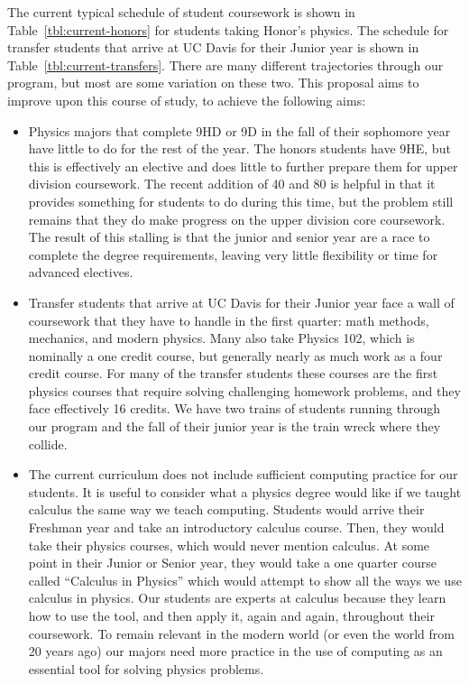\documentclass[12pt]{article}
\begin{document}
The current typical schedule of student coursework is shown in Table~\ref{tbl:current-honors} for students taking Honor's physics.  The schedule for transfer students that arrive at UC Davis for their Junior year is shown in Table~\ref{tbl:current-transfers}.  There are many different trajectories through our program, but most are some variation on these two.  This proposal aims to improve upon this course of study, to achieve the following aims:
\begin{itemize}

\item Physics majors that complete 9HD or 9D in the fall of their sophomore year have little to do for the rest of the year.  The honors students have 9HE, but this is effectively an elective and does little to further prepare them for upper division coursework.  The recent addition of 40 and 80 is helpful in that it provides something for students to do during this time, but the problem still remains that they do make progress on the upper division core coursework.  The result of this stalling is that the junior and senior year are a race to complete the degree requirements, leaving very little flexibility or time for advanced electives.

\item Transfer students that arrive at UC Davis for their Junior year face a wall of coursework that they have to handle in the first quarter: math methods, mechanics, and modern physics.  Many also take Physics 102, which is nominally a one credit course, but generally nearly as much work as a four credit course.  For many of the transfer students these courses are the first physics courses that require solving challenging homework problems, and they face effectively 16 credits.  We have two trains of students running through our program and the fall of their junior year is the train wreck where they collide.

\item The current curriculum does not include sufficient computing practice for our students.  It is useful to consider what a physics degree would like if we taught calculus the same way we teach computing.  Students would arrive their Freshman year and take an introductory calculus course.  Then, they would take their physics courses, which would never mention calculus.  At some point in their Junior or Senior year, they would take a one quarter course called ``Calculus in Physics'' which would attempt to show all the ways we use calculus in physics.  Our students are experts at calculus because they learn how to use the tool, and then apply it, again and again, throughout their coursework.  To remain relevant in the modern world (or even the world from 20 years ago) our majors need more practice in the use of computing as an essential tool for solving physics problems.


\end{itemize}
\end{document}

